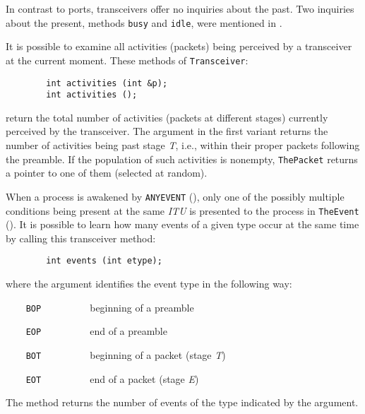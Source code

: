 In contrast to ports, transceivers offer no inquiries about the past.
Two inquiries about the present, methods {\tt busy} and {\tt idle},
were mentioned in .

It is possible to examine all activities (packets)
being perceived by a transceiver at the current moment.
These methods of {\tt Transceiver}:
\begin{verbatim}
        int activities (int &p);
        int activities ();
\end{verbatim}
\noindent
return the total number of activities (packets at different stages) currently
perceived by the transceiver.
The argument in
the first variant returns the number of activities
being past stage {\em T}, i.e., within their proper packets following the
preamble.
If the population of such activities is nonempty,
{\tt ThePacket} returns a pointer to one of them (selected at random).

When a process is awakened by {\tt ANYEVENT} (),
only one of the possibly multiple conditions being present at the same
{\em ITU\/} is presented to the process in {\tt TheEvent} ().
It is possible to learn how many events of a given type
occur at the same time by calling this transceiver method:
\begin{verbatim}
        int events (int etype);
\end{verbatim}
\noindent
where the argument identifies the event type in the following way:

\bigskip

\noindent
{\tt ~~~~BOP~~~~~~~~~} beginning of a preamble

\noindent
{\tt ~~~~EOP~~~~~~~~~} end of a preamble

\noindent
{\tt ~~~~BOT~~~~~~~~~} beginning of a packet (stage {\em T\/})

\noindent
{\tt ~~~~EOT~~~~~~~~~} end of a packet (stage {\em E\/})

\bigskip

\noindent
The method returns the number of events of the type indicated by the
argument.

